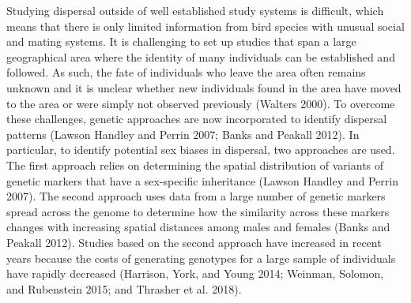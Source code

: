 \documentclass[
]{article}
\begin{document}
Studying dispersal outside of well established study systems is
difficult, which means that there is only limited information from bird
species with unusual social and mating systems. It is challenging to set
up studies that span a large geographical area where the identity of
many individuals can be established and followed. As such, the fate of
individuals who leave the area often remains unknown and it is unclear
whether new individuals found in the area have moved to the area or were
simply not observed previously (Walters 2000). To overcome these
challenges, genetic approaches are now incorporated to identify
dispersal patterns (Lawson Handley and Perrin 2007; Banks and Peakall
2012). In particular, to identify potential sex biases in dispersal, two
approaches are used. The first approach relies on determining the
spatial distribution of variants of genetic markers that have a
sex-specific inheritance (Lawson Handley and Perrin 2007). The second
approach uses data from a large number of genetic markers spread across
the genome to determine how the similarity across these markers changes
with increasing spatial distances among males and females (Banks and
Peakall 2012). Studies based on the second approach have increased in
recent years because the costs of generating genotypes for a large
sample of individuals have rapidly decreased (Harrison, York, and Young
2014; Weinman, Solomon, and Rubenstein 2015; and Thrasher et al. 2018).
\end{document}
